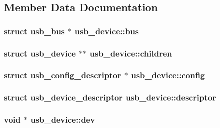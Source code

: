\subsection{Member Data Documentation}
\hypertarget{structusb__device_abec6a0ebc18d6aea7469cf459b44eb2d}{
\subsubsection[{bus}]{\setlength{\rightskip}{0pt plus 5cm}struct {\bf usb\-\_\-bus} $\ast$ usb\-\_\-device\-::bus}}\label{structusb__device_abec6a0ebc18d6aea7469cf459b44eb2d}
\hypertarget{structusb__device_a7c2c03784df4356da72087ace6f93197}{
\subsubsection[{children}]{\setlength{\rightskip}{0pt plus 5cm}struct {\bf usb\-\_\-device} $\ast$$\ast$ usb\-\_\-device\-::children}}\label{structusb__device_a7c2c03784df4356da72087ace6f93197}
\hypertarget{structusb__device_a0aa599e1b3de620e5d22dd537037a9b5}{
\subsubsection[{config}]{\setlength{\rightskip}{0pt plus 5cm}struct {\bf usb\-\_\-config\-\_\-descriptor} $\ast$ usb\-\_\-device\-::config}}\label{structusb__device_a0aa599e1b3de620e5d22dd537037a9b5}
\hypertarget{structusb__device_a33bbd71be994f58bf95c34f8a56db11f}{
\subsubsection[{descriptor}]{\setlength{\rightskip}{0pt plus 5cm}struct {\bf usb\-\_\-device\-\_\-descriptor} usb\-\_\-device\-::descriptor}}\label{structusb__device_a33bbd71be994f58bf95c34f8a56db11f}
\hypertarget{structusb__device_a279b5d9b87d8407f6fc455e707cc445b}{
\subsubsection[{dev}]{\setlength{\rightskip}{0pt plus 5cm}void $\ast$ usb\-\_\-device\-::dev}}\label{structusb__device_a279b5d9b87d8407f6fc455e707cc445b}
